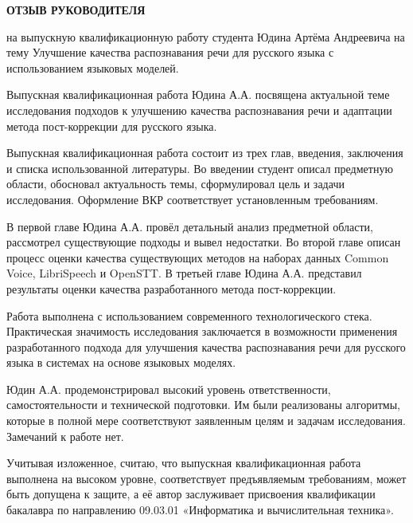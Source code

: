 \newpage
\clearpage
\begin{center}
    \textbf{ОТЗЫВ РУКОВОДИТЕЛЯ}
\end{center}

на выпускную квалификационную работу студента Юдина Артёма Андреевича на тему Улучшение качества распознавания речи для русского языка с использованием языковых моделей.

Выпускная квалификационная работа Юдина А.А. посвящена актуальной теме исследования подходов к улучшению качества распознавания речи и адаптации метода пост-коррекции для русского языка.

Выпускная квалификационная работа состоит из трех глав, введения, заключения и списка использованной литературы.
Во введении студент описал предметную области, обосновал актуальность темы, сформулировал цель и задачи исследования.
Оформление ВКР соответствует установленным требованиям.

В первой главе Юдина А.А. провёл детальный анализ предметной области, рассмотрел существующие подходы и вывел недостатки.
Во второй главе описан процесс оценки качества существующих методов на наборах данных Common Voice, LibriSpeech и OpenSTT.
В третьей главе Юдина А.А. представил результаты оценки качества разработанного метода пост-коррекции.

Работа выполнена с использованием современного технологического стека.
Практическая значимость исследования заключается в возможности применения разработанного подхода для улучшения качества распознавания речи для русского языка в системах на основе языковых моделях.

Юдин А.А. продемонстрировал высокий уровень ответственности, самостоятельности и технической подготовки.
Им были реализованы алгоритмы, которые в полной мере соответствуют заявленным целям и задачам исследования.
Замечаний к работе нет.

Учитывая изложенное, считаю, что выпускная квалификационная работа выполнена на высоком уровне, соответствует предъявляемым требованиям, может быть допущена к защите, а её автор заслуживает присвоения квалификации бакалавра по направлению 09.03.01 «Информатика и вычислительная техника».